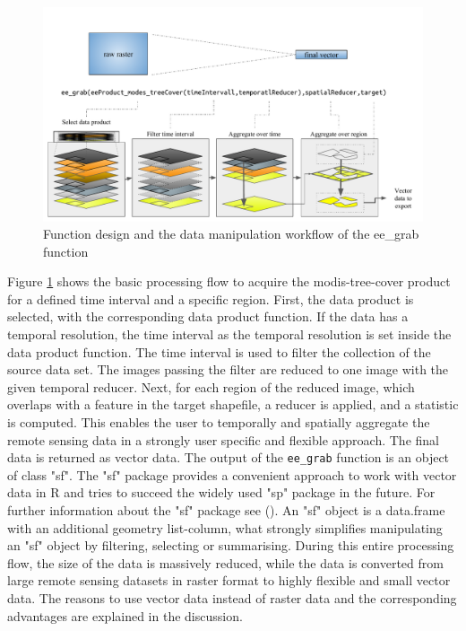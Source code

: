 \begin{center}
	\begin{figure}[h]
		\begin{center}
			\includegraphics[width=15cm]{images/design_function.pdf}
			\caption{Function design and the data manipulation workflow of the ee\_grab function}
			\label{Workflow}
		\end{center}
	\end{figure}
\end{center}

Figure \ref{Workflow} shows the basic processing flow to acquire the modis-tree-cover product for a defined time interval and a specific region. First, the data product is selected, with the corresponding data product function. If the data has a temporal resolution, the time interval as the temporal resolution is set inside the data product function. The time interval is used to filter the collection of the source data set. The images passing the filter are reduced to one image with the given temporal reducer. Next, for each region of the reduced image, which overlaps with a feature in the target shapefile, a reducer is applied, and a statistic is computed. This enables the user to temporally and spatially aggregate the remote sensing data in a strongly user specific and flexible approach. The final data is returned as vector data.
The output of the \texttt{ee\_grab} function is an object of class "sf". The "sf" package provides a convenient approach to work with vector data in R and tries to succeed the widely used "sp" package in the future. For further information about the "sf" package see (). An "sf" object is a data.frame with an additional geometry list-column, what strongly simplifies manipulating an "sf" object by filtering, selecting or summarising. 
During this entire processing flow, the size of the data is massively reduced, while the data is converted from large remote sensing datasets in raster format to highly flexible and small vector data. The reasons to use vector data instead of raster data and the corresponding advantages are explained in the discussion.


